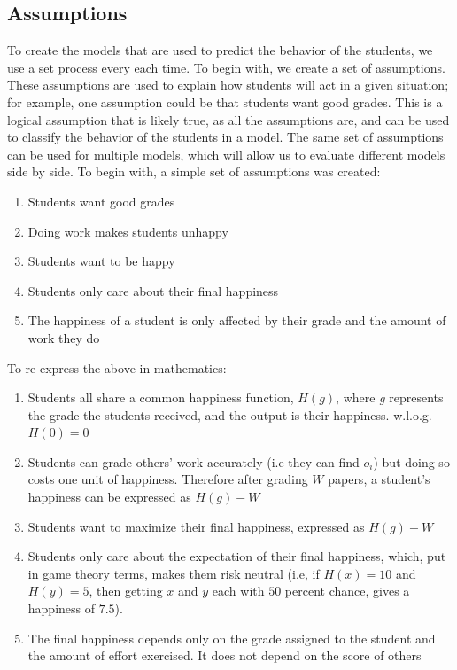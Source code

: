 \documentclass[12pt, Arial]{article}
\begin{document}
\subsection{Assumptions}
To create the models that are used to predict the behavior of the students, we use a set process every each time. To begin with, we create a set of assumptions. These assumptions are used to explain how students will act in a given situation; for example, one assumption could be that students want good grades. This is a logical assumption that is likely true, as all the assumptions are, and can be used to classify the behavior of the students in a model. The same set of assumptions can be used for multiple models, which will allow us to evaluate different models side by side. To begin with, a simple set of assumptions was created:
\begin{enumerate}[itemsep=0pt, parsep=0pt]
	\item Students want good grades
 	\item Doing work makes students unhappy
  	\item Students want to be happy
 	\item Students only care about their final happiness
  	\item The happiness of a student is only affected by their grade and the amount of work they do
\end{enumerate}
To re-express the above in mathematics:
\begin{enumerate}[itemsep=0pt, parsep=0pt]
  \item Students all share a common happiness function, $H(g)$, where \emph{g} represents the grade the students received, and the output is their happiness. w.l.o.g. $H(0)=0$
  \item Students can grade others' work accurately (i.e they can find $o_i$) but doing so costs one unit of happiness. Therefore after grading $W$ papers, a student's happiness can be expressed as $H(g)-W$
  \item Students want to maximize their final happiness, expressed as $H(g)-W$
  \item Students only care about the expectation of their final happiness, which, put in game theory terms, makes them risk neutral (i.e, if $H(x)=10$ and $H(y)=5$, then getting $x$ and $y$ each with $50$ percent chance, gives a happiness of $7.5$).
  \item The final happiness depends only on the grade assigned to the student and the amount of effort exercised. It does not depend on the score of others
\end{enumerate}
\end{document}
